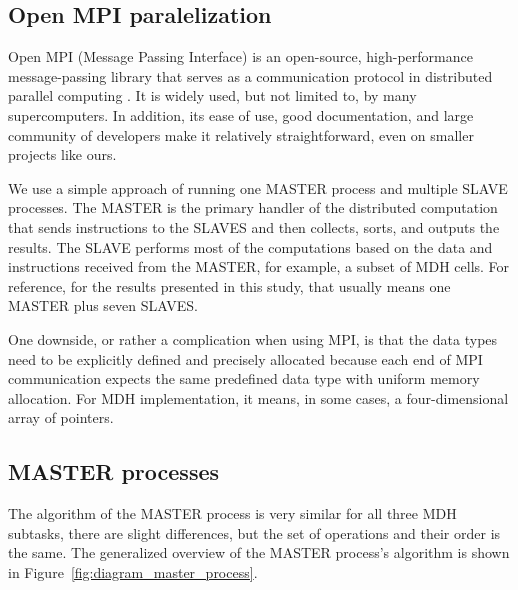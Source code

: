 \subsection{Open MPI paralelization}
    Open MPI (Message Passing Interface) is an open-source, high-performance message-passing library that serves as a communication protocol in distributed parallel computing \citep{openmpi2022}. It is widely used, but not limited to, by many supercomputers. In addition, its ease of use, good documentation, and large community of developers make it relatively straightforward, even on smaller projects like ours. 

    We use a simple approach of running one \mbox{MASTER} process and multiple SLAVE processes. The \mbox{MASTER} is the primary handler of the distributed computation that sends instructions to the SLAVES and then collects, sorts, and outputs the results. The SLAVE performs most of the computations based on the data and instructions received from the \mbox{MASTER}, for example, a subset of MDH cells. For reference, for the results presented in this study, that usually means one \mbox{MASTER} plus seven SLAVES.

    One downside, or rather a complication when using MPI, is that the data types need to be explicitly defined and precisely allocated because each end of MPI communication expects the same predefined data type with uniform memory allocation. For MDH implementation, it means, in some cases, a four-dimensional array of pointers.

\subsection{\mbox{MASTER} processes}
    The algorithm of the \mbox{MASTER} process is very similar for all three MDH subtasks, there are slight differences, but the set of operations and their order is the same. The generalized overview of the \mbox{MASTER} process's algorithm is shown in Figure~\ref{fig:diagram_master_process}.  


